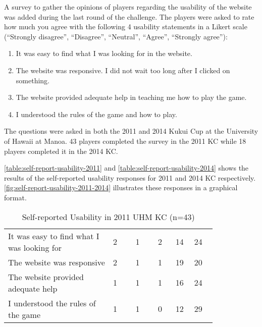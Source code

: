 A survey to gather the opinions of players regarding the usability of the website was added during the last round of the challenge. The players were asked to rate how much you agree with the following 4 usability statements in a Likert scale (``Strongly disagree'', ``Disagree'', ``Neutral'', ``Agree'', ``Strongly agree''):
\begin{enumerate}
\item It was easy to find what I was looking for in the website.
\item The website was responsive. I did not wait too long after I clicked on something.
\item The website provided adequate help in teaching me how to play the game.
\item I understood the rules of the game and how to play.
\end{enumerate}

The questions were asked in both the 2011 and 2014 Kukui Cup at the University of Hawaii at Manoa. 43 players completed the survey in the 2011 KC while 18 players completed it in the 2014 KC.  

\autoref{table:self-report-usability-2011}  and \autoref{table:self-report-usability-2014}  shows the results of the self-reported usability responses for 2011 and 2014 KC respectively. \autoref{fig:self-report-usability-2011-2014} illustrates these responses in a graphical format.

\begin{table}[ht!]
  \centering
  \begin{tabular} {|P{0.42\linewidth}|P{0.09\linewidth}|p{0.09\linewidth}|p{0.075\linewidth}|p{0.06\linewidth}|P{0.09\linewidth}|}
    \hline
    \centering {} &  &  &  &  & \\
    \hline
It was easy to find what I was looking for & 2 & 1 & 2 & 14 & 24 \\
    \hline
The website was responsive & 2 & 1 & 1& 19 & 20 \\
    \hline
The website provided adequate help & 1 & 1 & 1 & 16 & 24\\
    \hline
I understood the rules of the game & 1& 1 & 0 & 12 & 29\\
    \hline 
  \end{tabular}
  \caption{Self-reported Usability in 2011 UHM KC (n=43)}
  \label{table:self-report-usability-2011}
\end{table}


